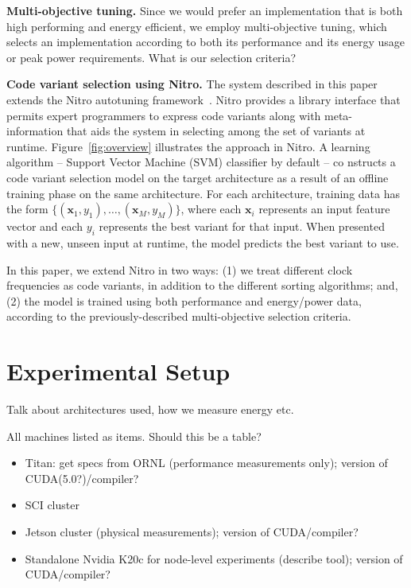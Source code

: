 \documentclass{sig-alternate}
\begin{document}
\noindent
{\bf Multi-objective tuning.}
Since we would prefer an implementation that is both high performing and
energy efficient, we employ multi-objective tuning, which selects an 
implementation according to both its performance and its energy usage or
peak power requirements.  
{\color{red}What is our selection criteria?}

\noindent
{\bf Code variant selection using Nitro.}
The system described in this paper extends
the Nitro autotuning framework~\cite{muralidharan:2014}.
Nitro provides a library interface that permits expert programmers to
express code variants along with meta-information that aids
the system in selecting among the set of variants at runtime.
Figure~\ref{fig:overview} illustrates the approach in Nitro.  
A learning algorithm -- Support Vector Machine (SVM) classifier by default -- co
nstructs a 
code variant selection
model on the target architecture as a result of an offline training phase on the
 same architecture.
For each architecture, training data has the form
$\{(\mathbf{x}_1, y_1), \hdots, (\mathbf{x}_M, y_M)\}$, where
each $\mathbf{x}_i$ represents an input feature vector and each
$y_i$ represents the best variant for that input.
When presented with a new, unseen input at runtime, the model
predicts the best variant to use. 

In this paper, we extend Nitro in two ways: (1) we treat 
different clock frequencies as code variants, in addition to the
different sorting algorithms; and, (2) the model is trained
using both performance and energy/power data, according to the 
previously-described multi-objective selection criteria.

\section{Experimental Setup}

Talk about architectures used, how we measure energy etc.

{\color{red} All machines listed as items.  Should this be a table?}
\begin{itemize}
\item Titan: get specs from ORNL (performance measurements only); version of CUDA(5.0?)/compiler?
\item SCI cluster
\item Jetson cluster (physical measurements); version of CUDA/compiler?
\item Standalone Nvidia K20c for node-level experiments (describe tool); version of CUDA/compiler?
\end{itemize}
\end{document}
